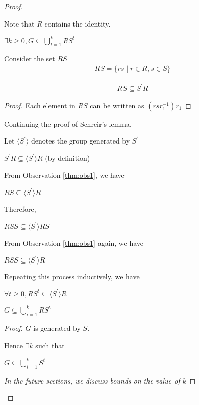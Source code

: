 \begin{proof}
\begin{remark}
\label{rem1}
Note that $R$ contains the identity. 
\end{remark}
\begin{proposition}
$\exists k \geq 0, G \subseteq \bigcup\limits_{t=1}^k RS^t$
\end{proposition}


Consider the set $RS$
\begin{align}
RS = \lbrace rs \mid r \in R, s \in S \rbrace 
\end{align}
\begin{observation}
\label{thm:obs1}
\begin{align}
RS \subseteq S^\prime R
\end{align}
\end{observation}
\begin{proof}
Each element in $RS$ can be written as $(r s r_1^{-1}) r_1$
\end{proof}
Continuing the proof of Schreir's lemma, 


Let $\langle S^\prime \rangle$ denotes the group generated by $S^\prime$ 

$S^\prime R \subseteq \langle S^\prime \rangle R$ (by definition) 

From Observation \ref{thm:obs1}, we have

$RS \subseteq \langle S^\prime \rangle R$

Therefore, 

$ RSS \subseteq \langle S^\prime \rangle R S $

From Observation \ref{thm:obs1} again, we have 

$RSS  \subseteq \langle S^\prime \rangle R $

Repeating this process inductively, we have

$\forall t \geq 0, RS^t \subseteq \langle S^\prime \rangle R$

\begin{observation}
\label{thm:obs2}
$ G \subseteq \bigcup\limits_{i=1}^k RS^t$
\end{observation}

\begin{proof}
$G$ is generated by $S$. 

Hence $\exists k$ such that 

$G \subseteq \bigcup\limits_{i=1}^k S^t $

\textit{In the future sections, we discuss bounds on the value of $k$}


\end{proof}
\end{proof}
